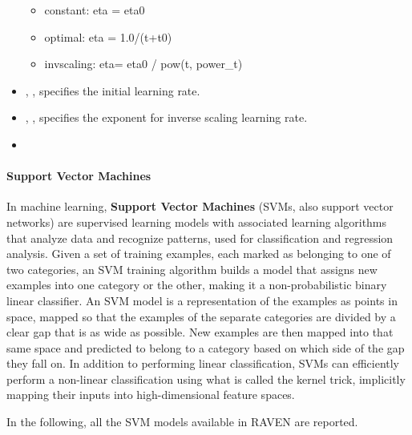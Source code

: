 \begin{itemize}
\begin{itemize}
    \item constant: eta = eta0
    \item optimal: eta = 1.0/(t+t0)
    \item invscaling: eta= eta0 / pow(t, power\_t)
  \end{itemize}
  \item {}, , specifies the initial learning rate.
  \item {}, , specifies the
  exponent for inverse scaling learning rate.
  \item {}
\end{itemize}

\paragraph{Support Vector Machines}
\label{SVM}
In machine learning, \textbf{Support Vector Machines} (SVMs, also support vector
networks) are supervised learning models with associated learning algorithms
that analyze data and recognize patterns, used for classification and regression
analysis.
%
Given a set of training examples, each marked as belonging to one of two
categories, an SVM training algorithm builds a model that assigns new examples
into one category or the other, making it a non-probabilistic binary linear
classifier.
%
An SVM model is a representation of the examples as points in space, mapped so
that the examples of the separate categories are divided by a clear gap that is
as wide as possible.
%
New examples are then mapped into that same space and predicted to belong to a
category based on which side of the gap they fall on.
%
In addition to performing linear classification, SVMs can efficiently perform a
non-linear classification using what is called the kernel trick, implicitly
mapping their inputs into high-dimensional feature spaces.
%

In the following, all the SVM models available in RAVEN are reported.

